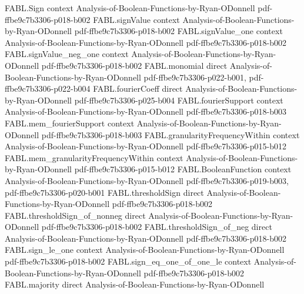 \begin{theorem}
\label{FABL.orFunction_monotone}
\leanok
{}
\proofstep
  {FABL.Sign}
  {context}
  {Analysis-of-Boolean-Functions-by-Ryan-ODonnell}
  {pdf-ffbe9c7b3306-p018-b002}
\proofstep
  {FABL.signValue}
  {context}
  {Analysis-of-Boolean-Functions-by-Ryan-ODonnell}
  {pdf-ffbe9c7b3306-p018-b002}
\proofstep
  {FABL.signValue_one}
  {context}
  {Analysis-of-Boolean-Functions-by-Ryan-ODonnell}
  {pdf-ffbe9c7b3306-p018-b002}
\proofstep
  {FABL.signValue_neg_one}
  {context}
  {Analysis-of-Boolean-Functions-by-Ryan-ODonnell}
  {pdf-ffbe9c7b3306-p018-b002}
\proofstep
  {FABL.monomial}
  {direct}
  {Analysis-of-Boolean-Functions-by-Ryan-ODonnell}
  {pdf-ffbe9c7b3306-p022-b001,
    pdf-ffbe9c7b3306-p022-b004}
\proofstep
  {FABL.fourierCoeff}
  {direct}
  {Analysis-of-Boolean-Functions-by-Ryan-ODonnell}
  {pdf-ffbe9c7b3306-p025-b004}
\proofstep
  {FABL.fourierSupport}
  {context}
  {Analysis-of-Boolean-Functions-by-Ryan-ODonnell}
  {pdf-ffbe9c7b3306-p018-b003}
\proofstep
  {FABL.mem_fourierSupport}
  {context}
  {Analysis-of-Boolean-Functions-by-Ryan-ODonnell}
  {pdf-ffbe9c7b3306-p018-b003}
\proofstep
  {FABL.granularityFrequencyWithin}
  {context}
  {Analysis-of-Boolean-Functions-by-Ryan-ODonnell}
  {pdf-ffbe9c7b3306-p015-b012}
\proofstep
  {FABL.mem_granularityFrequencyWithin}
  {context}
  {Analysis-of-Boolean-Functions-by-Ryan-ODonnell}
  {pdf-ffbe9c7b3306-p015-b012}
\proofstep
  {FABL.BooleanFunction}
  {context}
  {Analysis-of-Boolean-Functions-by-Ryan-ODonnell}
  {pdf-ffbe9c7b3306-p019-b003,
    pdf-ffbe9c7b3306-p020-b001}
\proofstep
  {FABL.thresholdSign}
  {direct}
  {Analysis-of-Boolean-Functions-by-Ryan-ODonnell}
  {pdf-ffbe9c7b3306-p018-b002}
\proofstep
  {FABL.thresholdSign_of_nonneg}
  {direct}
  {Analysis-of-Boolean-Functions-by-Ryan-ODonnell}
  {pdf-ffbe9c7b3306-p018-b002}
\proofstep
  {FABL.thresholdSign_of_neg}
  {direct}
  {Analysis-of-Boolean-Functions-by-Ryan-ODonnell}
  {pdf-ffbe9c7b3306-p018-b002}
\proofstep
  {FABL.sign_le_one}
  {context}
  {Analysis-of-Boolean-Functions-by-Ryan-ODonnell}
  {pdf-ffbe9c7b3306-p018-b002}
\proofstep
  {FABL.sign_eq_one_of_one_le}
  {context}
  {Analysis-of-Boolean-Functions-by-Ryan-ODonnell}
  {pdf-ffbe9c7b3306-p018-b002}
\proofstep
  {FABL.majority}
  {direct}
  {Analysis-of-Boolean-Functions-by-Ryan-ODonnell}

\end{theorem}
